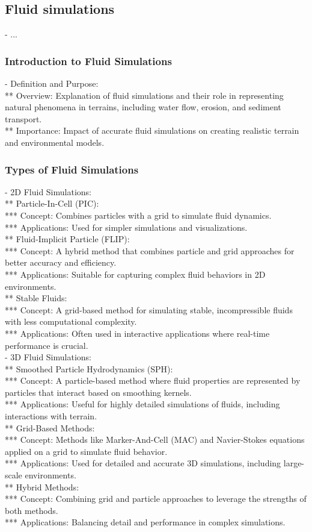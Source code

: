 \subsection{Fluid simulations}
- ... 
\subsubsection{Introduction to Fluid Simulations}
- Definition and Purpose: \\
** Overview: Explanation of fluid simulations and their role in representing natural phenomena in terrains, including water flow, erosion, and sediment transport. \\
** Importance: Impact of accurate fluid simulations on creating realistic terrain and environmental models.\\
\subsubsection{Types of Fluid Simulations}
- 2D Fluid Simulations: \\
** Particle-In-Cell (PIC): \\
*** Concept: Combines particles with a grid to simulate fluid dynamics. \\
*** Applications: Used for simpler simulations and visualizations. \\
** Fluid-Implicit Particle (FLIP): \\
*** Concept: A hybrid method that combines particle and grid approaches for better accuracy and efficiency. \\
*** Applications: Suitable for capturing complex fluid behaviors in 2D environments. \\
** Stable Fluids: \\
*** Concept: A grid-based method for simulating stable, incompressible fluids with less computational complexity. \\
*** Applications: Often used in interactive applications where real-time performance is crucial.\\
- 3D Fluid Simulations: \\
** Smoothed Particle Hydrodynamics (SPH): \\
*** Concept: A particle-based method where fluid properties are represented by particles that interact based on smoothing kernels. \\
*** Applications: Useful for highly detailed simulations of fluids, including interactions with terrain. \\
** Grid-Based Methods: \\
*** Concept: Methods like Marker-And-Cell (MAC) and Navier-Stokes equations applied on a grid to simulate fluid behavior. \\
*** Applications: Used for detailed and accurate 3D simulations, including large-scale environments. \\
** Hybrid Methods: \\
*** Concept: Combining grid and particle approaches to leverage the strengths of both methods.\\
*** Applications: Balancing detail and performance in complex simulations. 

